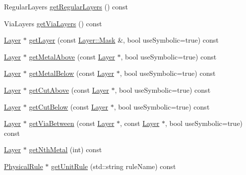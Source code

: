 \begin{DoxyCompactItemize}
\item 
Regular\+Layers \mbox{\hyperlink{classHurricane_1_1Technology_abffce542bc1cee054b4a09c64449f3b8}{get\+Regular\+Layers}} () const
\item 
Via\+Layers \mbox{\hyperlink{classHurricane_1_1Technology_aacde973f6a02a232a01f3f618576e1ee}{get\+Via\+Layers}} () const
\item 
\mbox{\hyperlink{classHurricane_1_1Layer}{Layer}} $\ast$ \mbox{\hyperlink{classHurricane_1_1Technology_a2ab8d2c386bf3daeb2b93d92ecbac6b4}{get\+Layer}} (const \mbox{\hyperlink{classHurricane_1_1Layer_af5277c670637bd5d910237e7afe01a91}{Layer\+::\+Mask}} \&, bool use\+Symbolic=true) const
\item 
\mbox{\hyperlink{classHurricane_1_1Layer}{Layer}} $\ast$ \mbox{\hyperlink{classHurricane_1_1Technology_af5723b08c9d289ffef8159ac2ea71b74}{get\+Metal\+Above}} (const \mbox{\hyperlink{classHurricane_1_1Layer}{Layer}} $\ast$, bool use\+Symbolic=true) const
\item 
\mbox{\hyperlink{classHurricane_1_1Layer}{Layer}} $\ast$ \mbox{\hyperlink{classHurricane_1_1Technology_ae02123406c7362cc14413727e8689d5a}{get\+Metal\+Below}} (const \mbox{\hyperlink{classHurricane_1_1Layer}{Layer}} $\ast$, bool use\+Symbolic=true) const
\item 
\mbox{\hyperlink{classHurricane_1_1Layer}{Layer}} $\ast$ \mbox{\hyperlink{classHurricane_1_1Technology_ac7125a8eea871918e74bb295c56caceb}{get\+Cut\+Above}} (const \mbox{\hyperlink{classHurricane_1_1Layer}{Layer}} $\ast$, bool use\+Symbolic=true) const
\item 
\mbox{\hyperlink{classHurricane_1_1Layer}{Layer}} $\ast$ \mbox{\hyperlink{classHurricane_1_1Technology_a3ca39dccc7e19b404181f55777e1b933}{get\+Cut\+Below}} (const \mbox{\hyperlink{classHurricane_1_1Layer}{Layer}} $\ast$, bool use\+Symbolic=true) const
\item 
\mbox{\hyperlink{classHurricane_1_1Layer}{Layer}} $\ast$ \mbox{\hyperlink{classHurricane_1_1Technology_a8209708bc594a307ea39f15a39bbf196}{get\+Via\+Between}} (const \mbox{\hyperlink{classHurricane_1_1Layer}{Layer}} $\ast$, const \mbox{\hyperlink{classHurricane_1_1Layer}{Layer}} $\ast$, bool use\+Symbolic=true) const
\item 
\mbox{\hyperlink{classHurricane_1_1Layer}{Layer}} $\ast$ \mbox{\hyperlink{classHurricane_1_1Technology_a81a3f3e479aeb686c61a2d0fa2931f3b}{get\+Nth\+Metal}} (int) const
\item 
\mbox{\hyperlink{classHurricane_1_1PhysicalRule}{Physical\+Rule}} $\ast$ \mbox{\hyperlink{classHurricane_1_1Technology_a6ab76e8a246a10a395d68341bca9ea96}{get\+Unit\+Rule}} (std\+::string rule\+Name) const

\end{DoxyCompactItemize}

